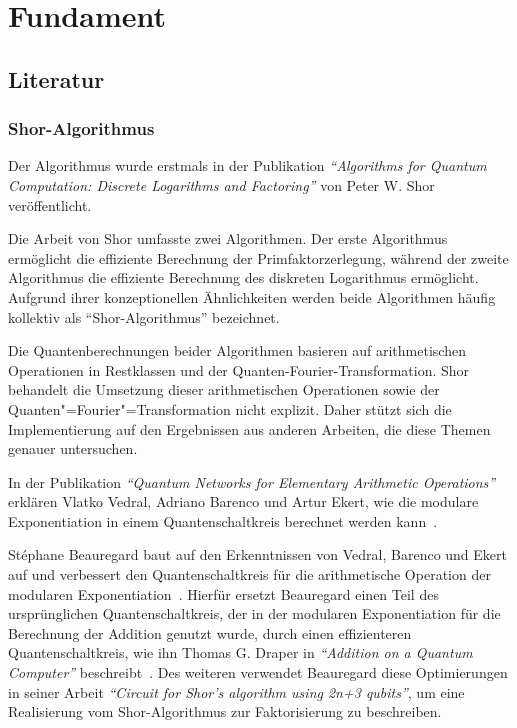 \section{Fundament}
\subsection{Literatur} 
\subsubsection*{Shor-Algorithmus}
Der Algorithmus wurde erstmals in der Publikation \textit{"`Algorithms for Quantum Computation: Discrete Logarithms and Factoring"'} von Peter W. Shor veröffentlicht.

Die Arbeit von Shor umfasste zwei Algorithmen.
Der erste Algorithmus ermöglicht die effiziente Berechnung der Primfaktorzerlegung, 
während der zweite Algorithmus die effiziente Berechnung des diskreten Logarithmus ermöglicht.
Aufgrund ihrer konzeptionellen Ähnlichkeiten werden beide Algorithmen häufig kollektiv als "`Shor-Algorithmus"' bezeichnet.

Die Quantenberechnungen beider Algorithmen basieren auf arithmetischen Operationen in Restklassen und der Quanten-Fourier-Transformation. 
Shor behandelt die Umsetzung dieser arithmetischen Operationen sowie der Quanten"=Fourier"=Transformation nicht explizit. 
Daher stützt sich die Implementierung auf den Ergebnissen aus anderen Arbeiten, die diese Themen genauer untersuchen.

In der Publikation \textit{"`Quantum Networks for Elementary Arithmetic Operations"'} erklären Vlatko Vedral,  Adriano Barenco und Artur Ekert,
wie die modulare Exponentiation in einem Quantenschaltkreis berechnet werden kann~\cite{Vedral_1996}. 

St\'{e}phane Beauregard baut auf den Erkenntnissen von Vedral, Barenco und Ekert auf und
verbessert den Quantenschaltkreis für die arithmetische Operation der modularen Exponentiation~\cite{beauregard2003circuit}.
Hierfür ersetzt Beauregard einen Teil des ursprünglichen Quantenschaltkreis,
der in der modularen Exponentiation für die Berechnung der Addition genutzt wurde, 
durch einen effizienteren Quantenschaltkreis,
wie ihn Thomas G. Draper in \textit{"`Addition on a Quantum Computer"'} beschreibt~\cite{draper2000addition}.
Des weiteren verwendet Beauregard diese Optimierungen in seiner Arbeit \textit{"`Circuit for Shor’s algorithm using 2n+3 qubits"'},
um eine Realisierung vom Shor-Algorithmus zur Faktorisierung zu beschreiben.

